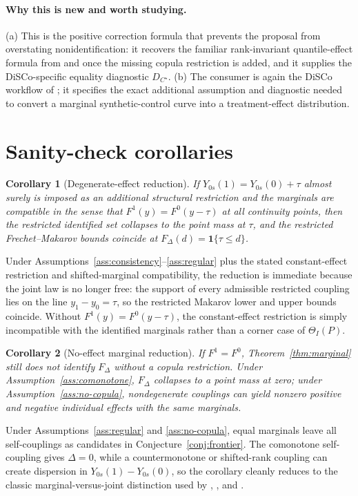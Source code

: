 \documentclass[11pt]{article}
\newcommand{\one}{\mathbf{1}}
\theoremstyle{definition}
\theoremstyle{plain}
\newtheorem{corollary}{Corollary}
\theoremstyle{remark}
\begin{document}
\paragraph{Why this is new and worth studying.}
(a) This is the positive correction formula that prevents the proposal from overstating nonidentification: it recovers the familiar rank-invariant quantile-effect formula from \cite{AtheyImbens2006CIC} and \cite{CallawayLi2019QTEDID} once the missing copula restriction is added, and it supplies the DiSCo-specific equality diagnostic \(D_{C^\star}\).  (b) The consumer is again the DiSCo workflow of \cite{Gunsilius2023DiSCo}; it specifies the exact additional assumption and diagnostic needed to convert a marginal synthetic-control curve into a treatment-effect distribution.

\section{Sanity-check corollaries}
\begin{corollary}[Degenerate-effect reduction]\label{cor:degenerate}
If \(Y_{0s}(1)=Y_{0s}(0)+\tau\) almost surely is imposed as an additional structural restriction and the marginals are compatible in the sense that \(F^1(y)=F^0(y-\tau)\) at all continuity points, then the restricted identified set collapses to the point mass at \(\tau\), and the restricted Frechet--Makarov bounds coincide at \(F_\Delta(d)=\one\{\tau\le d\}\).
\end{corollary}
Under Assumptions~\ref{ass:consistency}--\ref{ass:regular} plus the stated constant-effect restriction and shifted-marginal compatibility, the reduction is immediate because the joint law is no longer free: the support of every admissible restricted coupling lies on the line \(y_1-y_0=\tau\), so the restricted Makarov lower and upper bounds coincide.  Without \(F^1(y)=F^0(y-\tau)\), the constant-effect restriction is simply incompatible with the identified marginals rather than a corner case of \(\Theta_I(P)\).

\begin{corollary}[No-effect marginal reduction]\label{cor:noeffect}
If \(F^1=F^0\), Theorem~\ref{thm:marginal} still does not identify \(F_\Delta\) without a copula restriction.  Under Assumption~\ref{ass:comonotone}, \(F_\Delta\) collapses to a point mass at zero; under Assumption~\ref{ass:no-copula}, nondegenerate couplings can yield nonzero positive and negative individual effects with the same marginals.
\end{corollary}
Under Assumptions~\ref{ass:regular} and \ref{ass:no-copula}, equal marginals leave all self-couplings as candidates in Conjecture~\ref{conj:frontier}.  The comonotone self-coupling gives \(\Delta=0\), while a countermonotone or shifted-rank coupling can create dispersion in \(Y_{0s}(1)-Y_{0s}(0)\), so the corollary cleanly reduces to the classic marginal-versus-joint distinction used by \cite{FanPark2010SharpBounds}, \cite{FirpoRidder2019Functionals}, and \cite{Callaway2021BoundsDTEPanel}.
\end{document}
